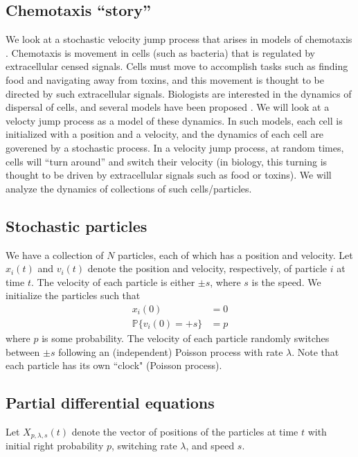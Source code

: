 \documentclass[prl,preprint]{revtex4-1}
\begin{document}
\subsection{Chemotaxis ``story''} 

We look at a stochastic velocity jump process that arises in models of chemotaxis \cite{othmer2000diffusion}.
%
Chemotaxis is movement in cells (such as bacteria) that is regulated by extracellular censed signals.
%
Cells must move to accomplish tasks such as finding food and navigating away from toxins, and this movement is thought to be directed by such extracellular signals.
%
Biologists are interested in the dynamics of dispersal of cells, and several models have been proposed \cite{othmer1988models, codling2008random}.
%
We will look at a velocty jump process as a model of these dynamics.
%
In such models, each cell is initialized with a position and a velocity, and the dynamics of each cell are goverened by a stochastic process.
%
In a velocity jump process, at random times, cells will ``turn around'' and switch their velocity (in biology, this turning is thought to be driven by extracellular signals such as food or toxins). 
%
We will analyze the dynamics of collections of such cells/particles. 

\subsection{Stochastic particles}

We have a collection of $N$ particles, each of which has a position and velocity. 
%
Let $x_i(t)$ and $v_i(t)$ denote the position and velocity, respectively, of particle $i$ at time $t$.
%
The velocity of each particle is either $\pm s$, where $s$ is the speed. 
%
We initialize the particles such that
\begin{eqnarray}
x_i(0) & = 0 \\
\mathbb{P} \{ v_i(0) = +s \} & = p
\end{eqnarray}
where $p$ is some probability.
%
The velocity of each particle randomly switches between $\pm s$ following an (independent) Poisson process with rate $\lambda$.
%
Note that each particle has its own ``clock" (Poisson process).

\subsection{Partial differential equations}

Let $X_{p, \lambda, s}(t)$ denote the vector of positions of the particles at time $t$ with initial right probability $p$, switching rate $\lambda$, and speed $s$.
\end{document}
